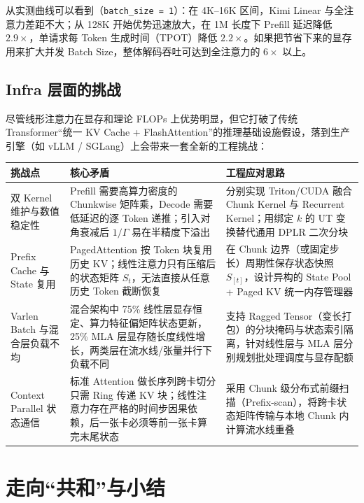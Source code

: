 \documentclass[11pt]{article}
\begin{document}
从实测曲线可以看到（\texttt{batch\_size = 1}）：在 4K--16K 区间，Kimi Linear 与全注意力差距不大；从 128K 开始优势迅速放大，在 1M 长度下 Prefill 延迟降低 $2.9\times$，单请求每 Token 生成时间（TPOT）降低 $2.2\times$。如果把节省下来的显存用来扩大并发 Batch Size，整体解码吞吐可达到全注意力的 $6\times$ 以上。

\subsection{Infra 层面的挑战}

尽管线形注意力在显存和理论 FLOPs 上优势明显，但它打破了传统 Transformer“统一 KV Cache + FlashAttention”的推理基础设施假设，落到生产引擎（如 vLLM / SGLang）上会带来一套全新的工程挑战：

\begin{table}[htbp]
  \centering
  \small
  \begin{tabular}{p{2.8cm}p{5.8cm}p{6.4cm}}
    \hline
    \textbf{挑战点} & \textbf{核心矛盾} & \textbf{工程应对思路} \\
    \hline
    双 Kernel 维护与数值稳定性 & Prefill 需要高算力密度的 Chunkwise 矩阵乘，Decode 需要低延迟的逐 Token 递推；引入对角衰减后 $1/\Gamma$ 易在半精度下溢出 & 分别实现 Triton/CUDA 融合 Chunk Kernel 与 Recurrent Kernel；用绑定 $k$ 的 UT 变换替代通用 DPLR 二次分块 \\
    \hline
    Prefix Cache 与 State 复用 & PagedAttention 按 Token 块复用历史 KV；线性注意力只有压缩后的状态矩阵 $S_t$，无法直接从任意历史 Token 截断恢复 & 在 Chunk 边界（或固定步长）周期性保存状态快照 $S_{[t]}$，设计异构的 State Pool + Paged KV 统一内存管理器 \\
    \hline
    Varlen Batch 与混合层负载不均 & 混合架构中 75\% 线性层显存恒定、算力特征偏矩阵状态更新，25\% MLA 层显存随长度线性增长，两类层在流水线/张量并行下负载不同 & 支持 Ragged Tensor（变长打包）的分块掩码与状态索引隔离，针对线性层与 MLA 层分别规划批处理调度与显存配额 \\
    \hline
    Context Parallel 状态通信 & 标准 Attention 做长序列跨卡切分只需 Ring 传递 KV 块；线性注意力存在严格的时间步因果依赖，后一张卡必须等前一张卡算完末尾状态 & 采用 Chunk 级分布式前缀扫描（Prefix-scan），将跨卡状态矩阵传输与本地 Chunk 内计算流水线重叠 \\
    \hline
  \end{tabular}
\end{table}

\section{走向“共和”与小结}
\end{document}
